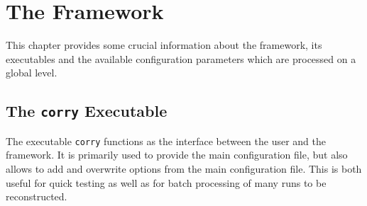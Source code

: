 \chapter{The \corrybold Framework}
\label{ch:framework}

This chapter provides some crucial information about the framework, its executables and the available configuration parameters which are processed on a global level.

\section{The \texttt{corry} Executable}
\label{sec:executable}
The \corry executable \texttt{corry} functions as the interface between the user and the framework.
It is primarily used to provide the main configuration file, but also allows to add and overwrite options from the main configuration file.
This is both useful for quick testing as well as for batch processing of many runs to be reconstructed.

